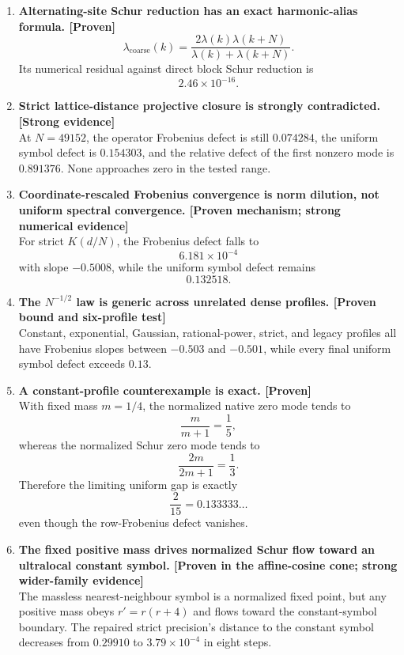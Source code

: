 \documentclass[11pt,a4paper,openany]{report}
\newcommand{\statusProven}{\textcolor{fingreen}{[Proven]}}
\newcommand{\statusStrong}{\textcolor{finblue}{[Strong evidence]}}
\begin{document}
\begin{enumerate}
\item 
\textbf{Alternating-site Schur reduction has an exact harmonic-alias formula. \statusProven{}} \[
   \lambda_{\mathrm{coarse}}(k)
   =
   \frac{
   2\lambda(k)\lambda(k+N)
   }{
   \lambda(k)+\lambda(k+N)
   }.
   \] Its numerical residual against direct block Schur reduction is \[
   2.46\times10^{-16}.
   \]

\item 
\textbf{Strict lattice-distance projective closure is strongly contradicted. \statusStrong{}}\\
At \(N=49152\), the operator Frobenius defect is still \(0.074284\), the uniform symbol defect is \(0.154303\), and the relative defect of the first nonzero mode is \(0.891376\). None approaches zero in the tested range.

\item 
\textbf{Coordinate-rescaled Frobenius convergence is norm dilution, not uniform spectral convergence. [Proven mechanism; strong numerical evidence]}\\
For strict \(K(d/N)\), the Frobenius defect falls to \[
   6.181\times10^{-4}
   \] with slope \(-0.5008\), while the uniform symbol defect remains \[
   0.132518.
   \]

\item 
\textbf{The \(N^{-1/2}\) law is generic across unrelated dense profiles. [Proven bound and six-profile test]}\\
Constant, exponential, Gaussian, rational-power, strict, and legacy profiles all have Frobenius slopes between \(-0.503\) and \(-0.501\), while every final uniform symbol defect exceeds \(0.13\).

\item 
\textbf{A constant-profile counterexample is exact. \statusProven{}}\\
With fixed mass \(m=1/4\), the normalized native zero mode tends to \[
   \frac{m}{m+1}=\frac15,
   \] whereas the normalized Schur zero mode tends to \[
   \frac{2m}{2m+1}=\frac13.
   \] Therefore the limiting uniform gap is exactly \[
   \frac{2}{15}=0.133333\ldots
   \] even though the row-Frobenius defect vanishes.

\item 
\textbf{The fixed positive mass drives normalized Schur flow toward an ultralocal constant symbol. [Proven in the affine-cosine cone; strong wider-family evidence]}\\
The massless nearest-neighbour symbol is a normalized fixed point, but any positive mass obeys \(r'=r(r+4)\) and flows toward the constant-symbol boundary. The repaired strict precision's distance to the constant symbol decreases from \(0.29910\) to \(3.79\times10^{-4}\) in eight steps.


\end{enumerate}
\end{document}
